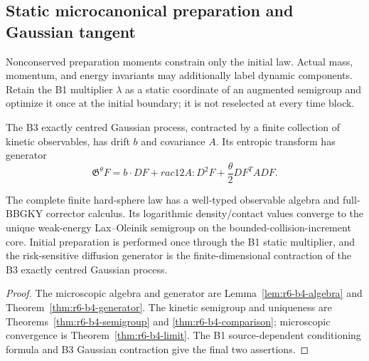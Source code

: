 \subsection{Static microcanonical preparation and Gaussian tangent}

Nonconserved preparation moments constrain only the initial law.  Actual mass,
momentum, and energy invariants may additionally label dynamic components.
Retain the B1 multiplier \(\lambda\) as a static coordinate of an augmented
semigroup and optimize it once at the initial boundary; it is not reselected
at every time block.

The B3 exactly centred Gaussian process, contracted by a finite collection of
kinetic observables, has drift \(b\) and covariance \(A\).  Its entropic
transform has generator
\[
\mathfrak G^\theta F=b\cdot DF+rac12A:D^2F+
\frac\theta2DF^TADF.
\]

\begin{theorem}
\label{thm:r6-b4-main}
The complete finite hard-sphere law has a well-typed observable algebra and
full-BBGKY corrector calculus.  Its logarithmic density/contact values
converge to the unique weak-energy Lax--Oleinik semigroup on the
bounded-collision-increment core.  Initial preparation is performed once
through the B1 static multiplier, and the risk-sensitive diffusion generator
is the finite-dimensional contraction of the B3 exactly centred Gaussian
process.
\end{theorem}

\begin{proof}
The microscopic algebra and generator are
Lemma~\ref{lem:r6-b4-algebra} and
Theorem~\ref{thm:r6-b4-generator}.  The kinetic semigroup and uniqueness are
Theorems~\ref{thm:r6-b4-semigroup} and
\ref{thm:r6-b4-comparison}; microscopic convergence is
Theorem~\ref{thm:r6-b4-limit}.  The B1 source-dependent conditioning formula
and B3 Gaussian contraction give the final two assertions.
\end{proof}
